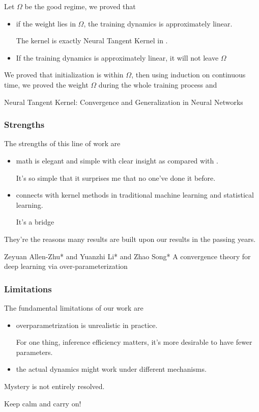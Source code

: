 \documentclass{beamer}   	%
\theoremstyle{definition}
\begin{document}
\begin{frame}
Let $\Omega$ be the good regime, we proved that
\begin{itemize}
	\item if the weight lies in $\Omega$, the training dynamics is approximately linear.

	The kernel is exactly Neural Tangent Kernel in \cite{ntk}.
	\item If the training dynamics is approximately linear, it will not leave $\Omega$
\end{itemize}

We proved that initialization is within $\Omega$, then using induction on continuous time, we proved the weight $\Omega$ during the whole training process and 
\begin{thebibliography}{9}
\scriptsize
{}
	Neural Tangent Kernel: Convergence and Generalization in Neural Networks
\end{thebibliography}
\end{frame}

\begin{frame}
\frametitle{Strengths}
The strengths of this line of work are
\begin{itemize}
	\item math is elegant and simple with clear insight as compared with \cite{yzl}.

	It's so simple that it surprises me that no one've done it before.
	\item connects with kernel methods in traditional machine learning and statistical learning.

	It's a bridge 
\end{itemize}

They're the reasons many results are built upon our results in the passing years.
\begin{thebibliography}{9}
\scriptsize
{} 
Zeyuan Allen-Zhu* and Yuanzhi Li* and Zhao Song*
A convergence theory for deep learning via over-parameterization
\end{thebibliography}
\end{frame}

\begin{frame}
\frametitle{Limitations}
The fundamental limitations of our work are
\begin{itemize}
	\item overparametrization is unrealistic in practice.

	For one thing, inference efficiency matters, it's more desirable to have fewer parameters.
	\item the actual dynamics might work under different mechanisms.
\end{itemize}

\vspace{5mm}

\vspace{5mm}

Mystery is not entirely resolved.

Keep calm and carry on!
\end{frame}
\end{document}
